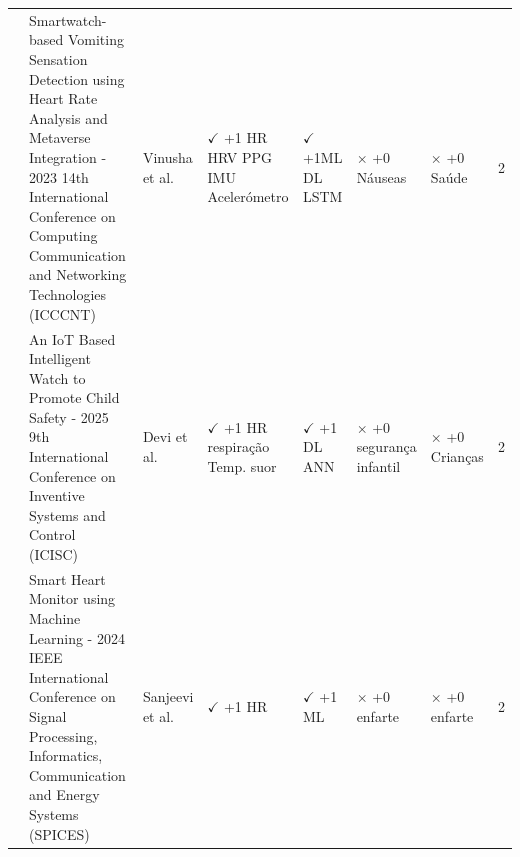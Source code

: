 \begin{table}[H]
{\begin{tabular}{>{\centering}p{0.5cm} p{4cm} >{\centering\arraybackslash}p{2cm} p{2cm} p{2cm} p{2cm} p{2cm} c}
\cite{vinusha2023} & Smartwatch-based Vomiting Sensation Detection using Heart Rate Analysis and Metaverse Integration - 2023 14th International Conference on Computing Communication and Networking Technologies (ICCCNT) & Vinusha et al. & \makecell[t]{$\checkmark$ +1 \\ HR \\ HRV \\ PPG \\ IMU \\ Acelerómetro} & \makecell[t]{$\checkmark$ +1ML\\DL\\LSTM} & \makecell[t]{$\times$ +0 \\ Náuseas} & \makecell[t]{$\times$ +0 \\ Saúde} & 2 \\
\cite{devi2025} & An IoT Based Intelligent Watch to Promote Child Safety - 2025 9th International Conference on Inventive Systems and Control (ICISC) & Devi et al. & \makecell[t]{$\checkmark$ +1 \\ HR \\ respiração \\ Temp.\\ suor} & \makecell[t]{$\checkmark$ +1\\DL\\ANN} & \makecell[t]{$\times$ +0 \\ segurança \\ infantil} & \makecell[t]{$\times$ +0 \\ Crianças} & 2 \\
\cite{sanjeevi2024} & Smart Heart Monitor using Machine Learning - 2024 IEEE International Conference on Signal Processing, Informatics, Communication and Energy Systems (SPICES) & Sanjeevi et al. & \makecell[t]{$\checkmark$ +1 \\ HR} & \makecell[t]{$\checkmark$ +1 \\ ML} & \makecell[t]{$\times$ +0 \\ enfarte} & \makecell[t]{$\times$ +0 \\ enfarte} & 2 \\
\hline
\end{tabular}
}%
\end{table}

